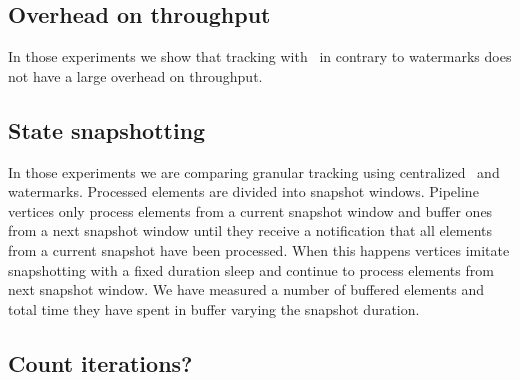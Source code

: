 \subsection{Overhead on throughput}

In those experiments we show that tracking with \tracker\ in contrary to watermarks does not have a large overhead on throughput.


\subsection{State snapshotting}

In those experiments we are comparing granular tracking using centralized \tracker\ and watermarks. Processed elements are divided into snapshot windows. Pipeline vertices only process elements from a current snapshot window and buffer ones from a next snapshot window until they receive a notification that all elements from a current snapshot have been processed. When this happens vertices imitate snapshotting with a fixed duration sleep and continue to process elements from next snapshot window. We have measured a number of buffered elements and total time they have spent in buffer varying the snapshot duration.


\subsection{Count iterations?}

